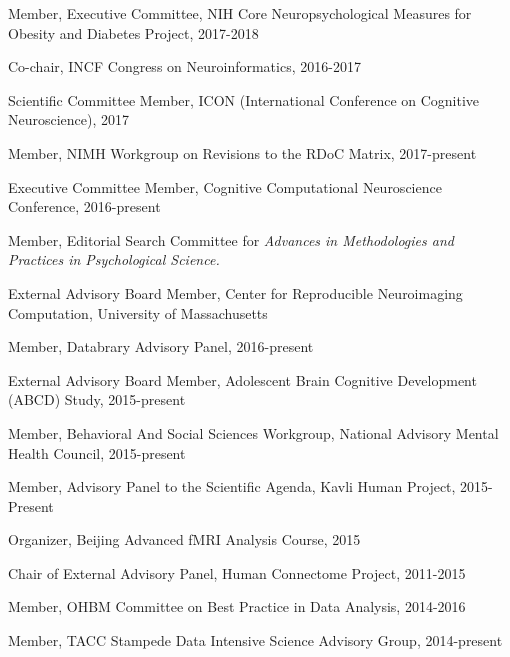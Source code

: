 \documentclass[10pt, letterpaper]{article}
\begin{document}
Member, Executive Committee, NIH Core Neuropsychological Measures for Obesity and Diabetes Project, 2017-2018  \vspace{2mm}

Co-chair, INCF Congress on Neuroinformatics, 2016-2017  \vspace{2mm}

Scientific Committee Member, ICON (International Conference on Cognitive Neuroscience), 2017  \vspace{2mm} 

Member, NIMH Workgroup on Revisions to the RDoC Matrix, 2017-present  \vspace{2mm} 

Executive Committee Member, Cognitive Computational Neuroscience Conference, 2016-present  \vspace{2mm} 

Member, Editorial Search Committee for \emph{Advances in Methodologies and Practices in Psychological Science.} \vspace{2mm} 

External Advisory Board Member, Center for Reproducible Neuroimaging Computation, University of Massachusetts  \vspace{2mm} 

Member, Databrary Advisory Panel, 2016-present   \vspace{2mm} 

External Advisory Board Member, Adolescent Brain Cognitive Development (ABCD) Study, 2015-present  \vspace{2mm} 

Member, Behavioral And Social Sciences Workgroup, National Advisory Mental Health Council, 2015-present  \vspace{2mm} 

Member, Advisory Panel to the Scientific Agenda, Kavli Human Project, 2015-Present  \vspace{2mm} 

Organizer, Beijing Advanced fMRI Analysis Course, 2015  \vspace{2mm} 

Chair of External Advisory Panel, Human Connectome Project, 2011-2015 \vspace{2mm} 

Member, OHBM Committee on Best Practice in Data Analysis, 2014-2016 \vspace{2mm} 

Member, TACC Stampede Data Intensive Science Advisory Group, 2014-present \vspace{2mm} 
\end{document}
